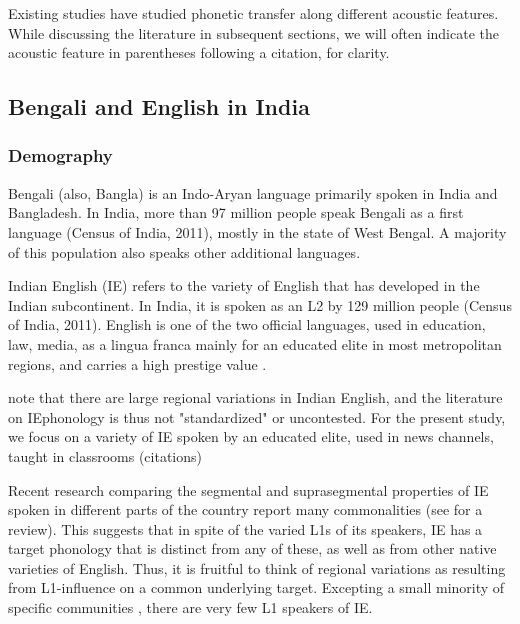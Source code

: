\documentclass[12 pt]{article}
\begin{document}
Existing studies have studied phonetic transfer along different acoustic features. While discussing the literature in subsequent sections, we will often indicate the acoustic feature in parentheses following a citation, for clarity. 

\subsection{Bengali and English in India} \label{bengali_english_in_india}

\subsubsection*{Demography} 

Bengali (also, Bangla) is an Indo-Aryan language primarily spoken in India and Bangladesh. In India, more than 97 million people speak Bengali as a first language (Census of India, 2011), mostly in the state of West Bengal. A majority of this population also speaks other additional languages.

Indian English (IE) refers to the variety of English that has developed in the Indian subcontinent. In India, it is spoken as an L2 by 129 million people (Census of India, 2011).  English is one of the two official languages, used in education, law, media, as a lingua franca mainly for an educated elite in most metropolitan regions, and carries a high prestige value \citep{pandey201517, kachru1981english, tollefson2014language, kachru1983indianization}.

\alert{note that there are large regional variations in Indian English, and the literature on IEphonology is thus not "standardized" or uncontested. For the present study, we focus on a variety of IE spoken by an educated elite, used in news channels, taught in classrooms (citations)}

Recent research comparing the segmental and suprasegmental properties of IE spoken in different parts of the country report many commonalities (see \cite{sirsa2013effects} for a review). This suggests that in spite of the varied L1s of its speakers, IE has a target phonology that is distinct from any of these, as well as from other native varieties of English. Thus, it is fruitful to think of regional variations as resulting from L1-influence on a common underlying target. Excepting a small minority of specific communities \citep{pandey201517, wells1982accents, coelho1997anglo}, there are very few L1 speakers of IE.
\end{document}
